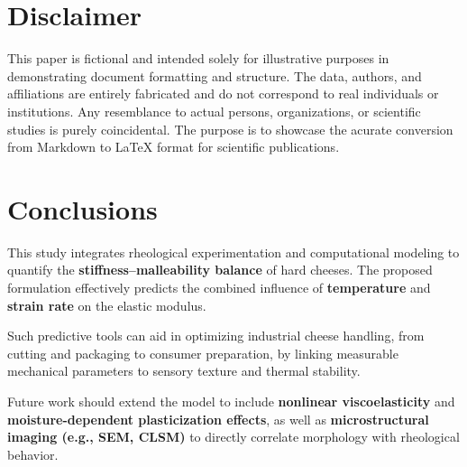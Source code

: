 \documentclass[a4paper,twoside]{article}
\begin{document}
\section{Disclaimer}\label{disclaimer}

This paper is fictional and intended solely for illustrative purposes in demonstrating
document formatting and structure. The data, authors, and affiliations are entirely
fabricated and do not correspond to real individuals or institutions. Any resemblance
to actual persons, organizations, or scientific studies is purely coincidental.
The purpose is to showcase the acurate conversion from Markdown to \LaTeX{} format
for scientific publications.

\section{Conclusions}\label{conclusions}

This study integrates rheological experimentation and computational modeling to
quantify the \textbf{stiffness--malleability balance} of hard cheeses. The proposed
formulation effectively predicts the combined influence of \textbf{temperature} and
\textbf{strain rate} on the elastic modulus.

Such predictive tools can aid in optimizing industrial cheese handling, from cutting
and packaging to consumer preparation, by linking measurable mechanical parameters to
sensory texture and thermal stability.

Future work should extend the model to include \textbf{nonlinear viscoelasticity} and
\textbf{moisture-dependent plasticization effects}, as well as \textbf{microstructural imaging
(e.g., SEM, CLSM)} to directly correlate morphology with rheological behavior.

\printbibliography
\end{document}
